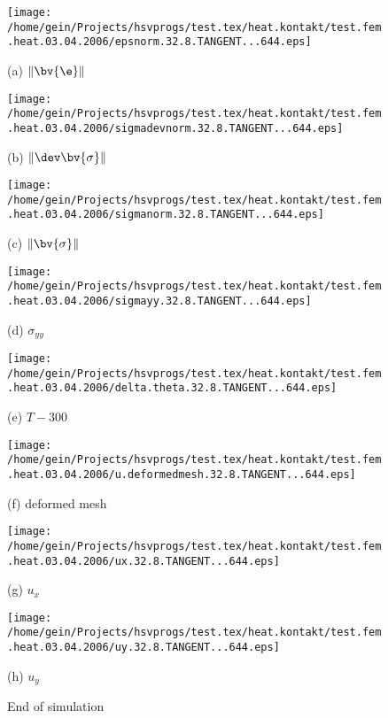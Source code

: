 \begin{figure}[h!]
\begin{minipage}[c]{7cm}
\texttt{[image: /home/gein/Projects/hsvprogs/test.tex/heat.kontakt/test.fem.heat.03.04.2006/epsnorm.32.8.TANGENT...644.eps]}

{(a) $\|\bv{\e}\|$}
\end{minipage}
\begin{minipage}[c]{7cm}
\texttt{[image: /home/gein/Projects/hsvprogs/test.tex/heat.kontakt/test.fem.heat.03.04.2006/sigmadevnorm.32.8.TANGENT...644.eps]}

{(b) $\|\dev\bv{\sigma}\|$}
\end{minipage}

\begin{minipage}[c]{7cm}
\texttt{[image: /home/gein/Projects/hsvprogs/test.tex/heat.kontakt/test.fem.heat.03.04.2006/sigmanorm.32.8.TANGENT...644.eps]}

{(c) $\|\bv{\sigma}\|$}
\end{minipage}
\begin{minipage}[c]{7cm}
\texttt{[image: /home/gein/Projects/hsvprogs/test.tex/heat.kontakt/test.fem.heat.03.04.2006/sigmayy.32.8.TANGENT...644.eps]}

{(d) $\sigma_{yy}$}
\end{minipage}

\begin{minipage}[c]{7cm}
\texttt{[image: /home/gein/Projects/hsvprogs/test.tex/heat.kontakt/test.fem.heat.03.04.2006/delta.theta.32.8.TANGENT...644.eps]}

{(e) $T-300$}
\end{minipage}
\begin{minipage}[c]{7cm}
\texttt{[image: /home/gein/Projects/hsvprogs/test.tex/heat.kontakt/test.fem.heat.03.04.2006/u.deformedmesh.32.8.TANGENT...644.eps]}

{(f) deformed mesh}
\end{minipage}

\begin{minipage}[c]{7cm}
\texttt{[image: /home/gein/Projects/hsvprogs/test.tex/heat.kontakt/test.fem.heat.03.04.2006/ux.32.8.TANGENT...644.eps]}

{(g) $u_x$}
\end{minipage}
\begin{minipage}[c]{7cm}
\texttt{[image: /home/gein/Projects/hsvprogs/test.tex/heat.kontakt/test.fem.heat.03.04.2006/uy.32.8.TANGENT...644.eps]}

{(h) $u_y$}
\end{minipage}
\caption{End of simulation}\label{fig:Fig2}
\end{figure}

